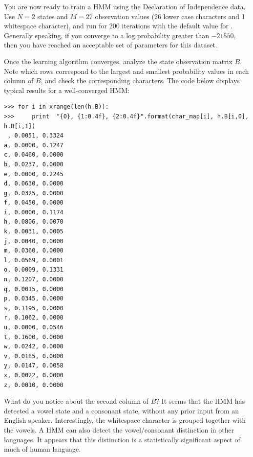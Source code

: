 \begin{problem}
You are now ready to train a HMM using the Declaration of Independence data.
Use $N=2$ states and $M=27$ observation values (26 lower case characters and 1 whitespace character),
and run for 200 iterations with the default value for .
Generally speaking, if you converge to a log probability greater than $-21550$, then you have reached
an acceptable set of parameters for this dataset.

Once the learning algorithm converges, analyze the state observation matrix $B$.
Note which rows correspond to the largest and smallest probability values in each column of $B$,
and check the corresponding characters.
The code below displays typical results for a well-converged HMM:
\begin{lstlisting}
>>> for i in xrange(len(h.B)):
>>>     print  "{0}, {1:0.4f}, {2:0.4f}".format(char_map[i], h.B[i,0], h.B[i,1])
 , 0.0051, 0.3324
a, 0.0000, 0.1247
c, 0.0460, 0.0000
b, 0.0237, 0.0000
e, 0.0000, 0.2245
d, 0.0630, 0.0000
g, 0.0325, 0.0000
f, 0.0450, 0.0000
i, 0.0000, 0.1174
h, 0.0806, 0.0070
k, 0.0031, 0.0005
j, 0.0040, 0.0000
m, 0.0360, 0.0000
l, 0.0569, 0.0001
o, 0.0009, 0.1331
n, 0.1207, 0.0000
q, 0.0015, 0.0000
p, 0.0345, 0.0000
s, 0.1195, 0.0000
r, 0.1062, 0.0000
u, 0.0000, 0.0546
t, 0.1600, 0.0000
w, 0.0242, 0.0000
v, 0.0185, 0.0000
y, 0.0147, 0.0058
x, 0.0022, 0.0000
z, 0.0010, 0.0000
\end{lstlisting}
What do you notice about the second column of $B$? It seems that the HMM has detected a vowel state and a consonant state, without any prior input from an English speaker.
Interestingly, the whitespace character is grouped together with the vowels. A HMM can also detect the vowel/consonant distinction in other languages. It appears that
this distinction is a statistically significant aspect of much of human language.
\end{problem}





